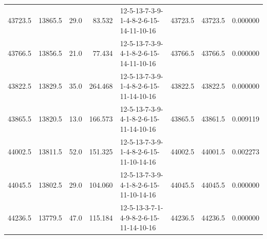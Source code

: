 \begin{tabular}{rrrrlrrr}
 43723.5 &  13865.5 &           29.0 &             83.532 &  12-5-13-7-3-9-1-4-8-2-6-15-14-11-10-16 &       43723.5 &         43723.5 &  0.000000 \\
 43766.5 &  13856.5 &           21.0 &             77.434 &  12-5-13-7-3-9-4-1-8-2-6-15-14-11-10-16 &       43766.5 &         43766.5 &  0.000000 \\
 43822.5 &  13829.5 &           35.0 &            264.468 &  12-5-13-7-3-9-1-4-8-2-6-15-11-14-10-16 &       43822.5 &         43822.5 &  0.000000 \\
 43865.5 &  13820.5 &           13.0 &            166.573 &  12-5-13-7-3-9-4-1-8-2-6-15-11-14-10-16 &       43865.5 &         43861.5 &  0.009119 \\
 44002.5 &  13811.5 &           52.0 &            151.325 &  12-5-13-7-3-9-1-4-8-2-6-15-11-10-14-16 &       44002.5 &         44001.5 &  0.002273 \\
 44045.5 &  13802.5 &           29.0 &            104.060 &  12-5-13-7-3-9-4-1-8-2-6-15-11-10-14-16 &       44045.5 &         44045.5 &  0.000000 \\
 44236.5 &  13779.5 &           47.0 &            115.184 &  12-5-13-3-7-1-4-9-8-2-6-15-11-14-10-16 &       44236.5 &         44236.5 &  0.000000 \\
\bottomrule
\end{tabular}
